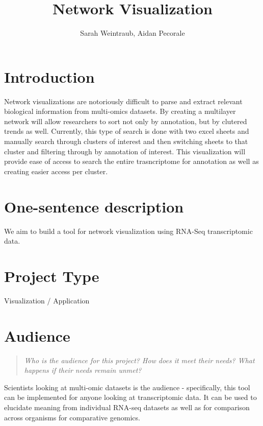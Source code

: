 \documentclass{proc}
\begin{document}
\title{Network Visualization}

\author{Sarah Weintraub, Aidan Pecorale}

\maketitle

\section{Introduction}

Network visualizations are notoriously difficult to parse and extract relevant biological information from multi-omics datasets. By creating a multilayer network will allow researchers to sort not only by annotation, but by clutered trends as well. Currently, this type of search is done with two excel sheets and manually search through clusters of interest and then switching sheets to that cluster and filtering through by annotation of interest. This visualization will provide ease of access to search the entire trasncriptome for annotation as well as creating easier access per cluster.

\section{One-sentence description}

We aim to build a tool for network visualization using RNA-Seq transcriptomic data.

\section{Project Type}

Visualization / Application

\section{Audience} 
\begin{quote}
\textit{Who is the audience for this project? 
How does it meet their needs? 
What happens if their needs remain unmet?}
\end{quote}

Scientists looking at multi-omic datasets is the audience - specifically, this tool can be implemented for anyone looking at transcriptomic data. It can be used to elucidate meaning from individual RNA-seq datasets as well as for comparison across organisms for comparative genomics. 
\end{document}
